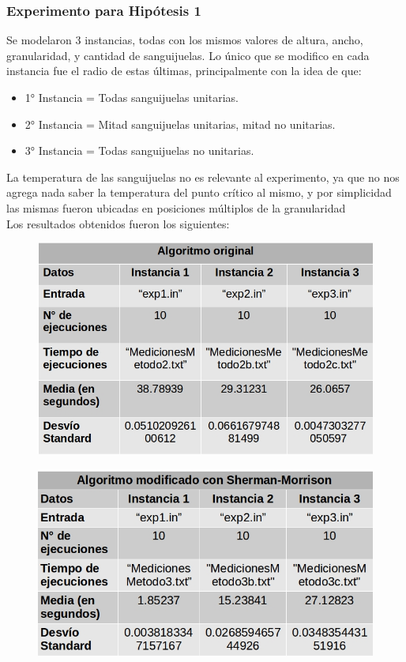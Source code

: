 \subsubsection{Experimento para Hipótesis 1}
Se modelaron 3 instancias, todas con los mismos valores de altura, ancho, granularidad, y cantidad de sanguijuelas. Lo único que se modifico en cada instancia fue el radio de estas últimas, principalmente con la idea de que:
 \begin{itemize}
    \item 1° Instancia = Todas sanguijuelas unitarias.
    \item 2° Instancia = Mitad sanguijuelas unitarias, mitad no unitarias.
    \item 3° Instancia  = Todas sanguijuelas no unitarias.
 \end{itemize}
 La temperatura de las sanguijuelas no es relevante al experimento, ya que no nos agrega nada saber la temperatura del punto crítico al mismo, y por simplicidad las mismas fueron ubicadas en posiciones múltiplos de la granularidad \\


Los resultados obtenidos fueron los siguientes:

\begin{figure}[H]
    \centering
    \includegraphics[scale=0.6]{graphs/tablaOriginal.jpg}
    \end{figure}
        
        
    \begin{figure}[H]
    \centering
    \includegraphics[scale=0.6]{graphs/tablaSherman.jpg}
    \end{figure}
        
